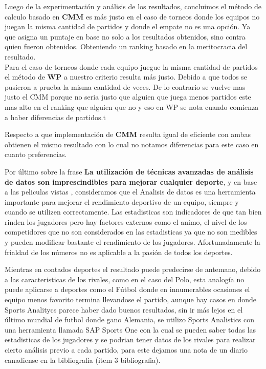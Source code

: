 Luego de la experimentación y análisis de los resultados, concluimos el método de calculo basado en \textbf{CMM} es m\'as justo en el 
caso de torneos donde los equipos no juegan la misma cantidad de partidos y donde el empate no es una opción. Ya que asigna un puntaje 
en base no solo a los resultados obtenidos, sino contra quien fueron obtenidos. Obteniendo un ranking basado en la meritocracia del resultado. \\

Para el caso de torneos donde cada equipo juegue la misma cantidad de partidos el método de \textbf{WP} a nuestro criterio resulta m\'as justo. 
Debido a que todos se pusieron a prueba la misma cantidad de veces. De lo contrario se vuelve mas justo el CMM porque no seria justo que alguien que juega menos partidos
este mas alto en el ranking que alguien que no y eso en WP se nota cuando comienza a haber diferencias de partidos.t

Respecto a que implementación de \textbf{CMM} resulta igual de eficiente con ambas obtienen el mismo resultado con lo cual no notamos diferencias para este caso en cuanto
preferencias.

Por último sobre la frase \textbf{La utilización de técnicas avanzadas de análisis de datos son imprescindibles para mejorar cualquier deporte}, 
 y en base a las peliculas vistas , consideramos que el Analisis de datos es una herramienta importante para mejorar el rendimiento deportivo de un equipo, 
siempre y cuando se utilizen correctamente. 
Las estadisticas son indicadores de que tan bien rinden los jugadores pero hay factores externos como el animo, el nivel de los competidores 
que no son considerados en las estadisticas ya que no son medibles y pueden modificar bastante el rendimiento de los jugadores.
Afortunadamente la frialdad de los números no es aplicable a la pasión de todos los deportes. 

Mientras en contados deportes el resultado puede predecirse de antemano, debido a las caracteristicas de los rivales, como en el caso del Polo, 
esta analogía no puede aplicarse a deportes como el Fútbol donde en innumerables ocasiones el equipo menos favorito termina llevandose el partido, aunque hay casos en donde
Sports Analitycs parece haber dado buenos resultados, sin ir m\'as lejos en el \'ultimo mundial de futbol donde gano Alemania, se utilizo Sports Analistics
con una herramienta llamada SAP Sports One con la cual se pueden saber todas las estadisticas de los jugadores y se podrian tener datos de los rivales para realizar
cierto an\'alisis previo a cada partido, para este dejamos una nota de un diario canadiense en la bibliografia (item 3 bibliografia).
